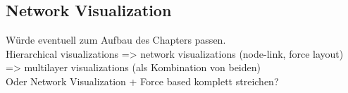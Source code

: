 \subsection{Network Visualization}
Würde eventuell zum Aufbau des Chapters passen. \\
Hierarchical visualizations => network visualizations (node-link, force layout) => multilayer visualizations (als Kombination von beiden)\\
Oder Network Visualization + Force based komplett streichen?


